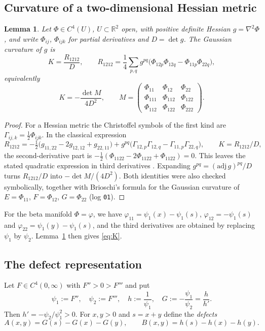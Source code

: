\documentclass[11pt,a4paper]{article}
\newtheorem{lemma}[theorem]{Lemma}
\theoremstyle{definition}
\theoremstyle{remark}
\newcommand{\R}{\mathbb{R}}
\begin{document}
\subsection{Curvature of a two-dimensional Hessian metric}
\begin{lemma}\label{lem:hessian}
Let $\Phi\in C^4(U)$, $U\subset\R^2$ open, with positive definite Hessian $g=\nabla^2\Phi$, and write $\Phi_{ij}$, $\Phi_{ijk}$ for partial derivatives and $D=\det g$. The Gaussian curvature of $g$ is
\[
K=\frac{R_{1212}}{D},\qquad R_{1212}=\frac14\sum_{p,q}g^{pq}\bigl(\Phi_{12p}\Phi_{12q}-\Phi_{11p}\Phi_{22q}\bigr),
\]
equivalently
\[
K=-\frac{\det M}{4D^2},\qquad M=\begin{pmatrix}\Phi_{11}&\Phi_{12}&\Phi_{22}\\\Phi_{111}&\Phi_{112}&\Phi_{122}\\\Phi_{112}&\Phi_{122}&\Phi_{222}\end{pmatrix}.
\]
\end{lemma}
\begin{proof}
For a Hessian metric the Christoffel symbols of the first kind are $\Gamma_{ij,k}=\frac12\Phi_{ijk}$. In the classical expression
\[
R_{1212}=-\tfrac12\bigl(g_{11,22}-2g_{12,12}+g_{22,11}\bigr)+g^{pq}\bigl(\Gamma_{12,p}\Gamma_{12,q}-\Gamma_{11,p}\Gamma_{22,q}\bigr),\qquad K=R_{1212}/D,
\]
the second-derivative part is $-\frac12(\Phi_{1122}-2\Phi_{1122}+\Phi_{1122})=0$. This leaves the stated quadratic expression in third derivatives \cite[Ch.~2]{Shi07}. Expanding $g^{pq}=(\mathrm{adj}\,g)^{pq}/D$ turns $R_{1212}/D$ into $-\det M/(4D^2)$. Both identities were also checked symbolically, together with Brioschi's formula for the Gaussian curvature of $E=\Phi_{11}$, $F=\Phi_{12}$, $G=\Phi_{22}$ (log \texttt{01}).
\end{proof}

For the beta manifold $\Phi=\varphi$, we have $\varphi_{11}=\psi_1(x)-\psi_1(s)$, $\varphi_{12}=-\psi_1(s)$ and $\varphi_{22}=\psi_1(y)-\psi_1(s)$, and the third derivatives are obtained by replacing $\psi_1$ by $\psi_2$. Lemma~\ref{lem:hessian} then gives \eqref{eq:K}.

\subsection{The defect representation}
Let $F\in C^4(0,\infty)$ with $F''>0>F'''$ and put
\[
\psi_1:=F'',\quad \psi_2:=F''',\quad h:=\frac1{\psi_1},\quad G:=-\frac{\psi_1}{\psi_2}=\frac{h}{h'} .
\]
Then $h'=-\psi_2/\psi_1^2>0$. For $x,y>0$ and $s=x+y$ define the \emph{defects}
\[
A(x,y)=G(s)-G(x)-G(y),\qquad B(x,y)=h(s)-h(x)-h(y).
\]
\end{document}
